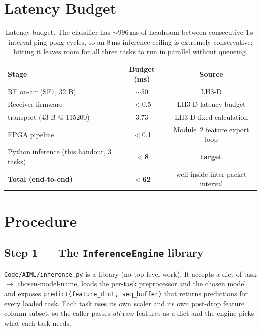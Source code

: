 \documentclass[11pt,letterpaper]{article}
\begin{document}
\section{Latency Budget}
\begin{table}[h!]
	\centering
	\renewcommand{\arraystretch}{1.3}
	\begin{tabularx}{\textwidth}{l c c}
		\toprule
		\textbf{Stage} & \textbf{Budget (ms)} & \textbf{Source} \\
		\midrule
		\mbox{RF} on-air (SF7, 32 B)        & $\sim$50   & LH3-D \\
		Receiver firmware                    & $<$0.5     & LH3-D latency budget \\
		\UART{} transport (43 B @ 115200)    & 3.73       & LH3-D fixed calculation \\
		\mbox{FPGA} pipeline                 & $<$0.1     & Module~2 feature export loop \\
		Python inference (this handout, 3 tasks) & \textbf{$<$8} & \textbf{target} \\
		\midrule
		\textbf{Total (end-to-end)}          & \textbf{$<$62} & well inside inter-packet interval \\
		\bottomrule
	\end{tabularx}
	\caption{Latency budget. The classifier has $\sim$996\,ms of headroom between consecutive 1\,s-interval ping-pong cycles, so an 8\,ms inference ceiling is extremely conservative; hitting it leaves room for all three tasks to run in parallel without queueing.}
\end{table}

\section{Procedure}

\subsection{Step 1 --- The \texttt{InferenceEngine} library}
\texttt{Code/AIML/inference.py} is a library (no top-level work). It accepts a dict of task $\to$ chosen-model-name, loads the per-task preprocessor and the chosen model, and exposes \texttt{predict(feature\_dict, seq\_buffer)} that returns predictions for every loaded task. Each task uses its own scaler and its own post-drop feature column subset, so the caller passes \emph{all} raw features as a dict and the engine picks what each task needs.
\end{document}
